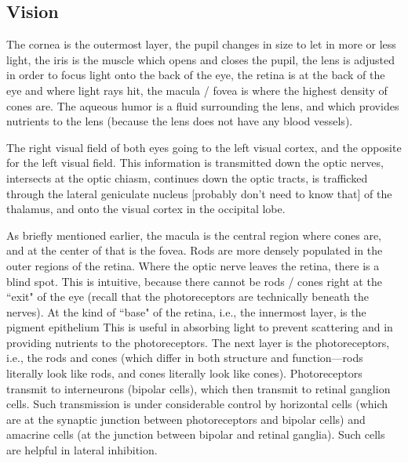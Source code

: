 \documentclass[12pt]{report}
\begin{document}
\subsection{Vision}

The cornea is the outermost layer, the pupil changes in size to let in more or less light, the iris is the muscle which opens and closes the pupil, the lens is adjusted in order to focus light onto the back of the eye, the retina is at the back of the eye and where light rays hit, the macula / fovea is where the highest density of cones are. The aqueous humor is a fluid surrounding the lens, and which provides nutrients to the lens (because the lens does not have any blood vessels).\newline

The right visual field of both eyes going to the left visual cortex, and the opposite for the left visual field. This information is transmitted down the optic nerves, intersects at the optic chiasm, continues down the optic tracts, is trafficked through the lateral geniculate nucleus [probably don't need to know that] of the thalamus, and onto the visual cortex in the occipital lobe.\newline

As briefly mentioned earlier, the macula is the central region where cones are, and at the center of that is the fovea. Rods are more densely populated in the outer regions of the retina. Where the optic nerve leaves the retina, there is a blind spot. This is intuitive, because there cannot be rods / cones right at the ``exit" of the eye (recall that the photoreceptors are technically beneath the nerves). At the kind of ``base" of the retina, i.e., the innermost layer, is the pigment epithelium This is useful in absorbing light to prevent scattering and in providing nutrients to the photoreceptors. The next layer is the photoreceptors, i.e., the rods and cones (which differ in both structure and function---rods literally look like rods, and cones literally look like cones). Photoreceptors transmit to interneurons (bipolar cells), which then transmit to retinal ganglion cells. Such transmission is under considerable control by horizontal cells (which are at the synaptic junction between photoreceptors and bipolar cells) and amacrine cells (at the junction between bipolar and retinal ganglia). Such cells are helpful in lateral inhibition. \newline
\end{document}
